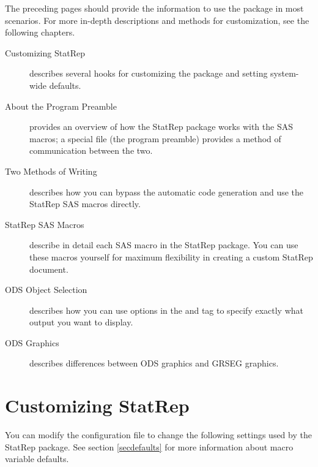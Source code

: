 \documentclass[article,oneside]{memoir}
\newcommand*{\StatRep}{\textsf{StatRep}\xspace}
\begin{document}
The preceding pages should provide the information to use the package
in most scenarios. For more in-depth descriptions and methods for
customization, see the following chapters.

\begin{description}
\item[Customizing \StatRep] describes several hooks for customizing
the package and setting system-wide defaults.
\item[About the Program Preamble] provides an overview of how the \StatRep
package works with the SAS macros; a special file (the program preamble)
provides a method of communication between the two.
\item[Two Methods of Writing] describes how you can bypass the automatic
code generation and use the \StatRep SAS macros directly.
\item[\StatRep SAS Macros] describe in detail each SAS macro in the
\StatRep package. You can use these macros yourself for maximum flexibility
in creating a custom \StatRep document.
\item[ODS Object Selection] describes how you can use options in the
 and  tag to specify exactly what output you want
to display.
\item[ODS Graphics] describes differences between ODS graphics and
GRSEG graphics.
\end{description}

\chapter{Customizing \StatRep}\label{custom}

  You can modify the configuration file  to change
the following settings used by the \StatRep package.
  See section \ref{secdefaults} for more information about macro variable defaults.
\end{document}
